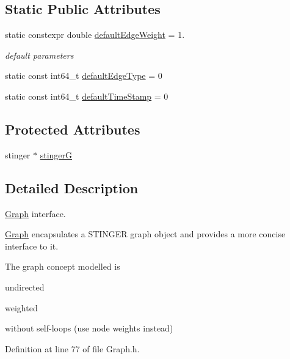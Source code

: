 \subsection*{Static Public Attributes}
\begin{DoxyCompactItemize}
\item 
static constexpr double \hyperlink{class_ensemble_clustering_1_1_graph_a8186ee969064a4e12b779b1dc506ac60}{default\-Edge\-Weight} = 1.
\begin{DoxyCompactList}\small\item\em default parameters \end{DoxyCompactList}\item 
static const int64\-\_\-t \hyperlink{class_ensemble_clustering_1_1_graph_a377621f37c1dc58f32ecec0fd229408e}{default\-Edge\-Type} = 0
\item 
static const int64\-\_\-t \hyperlink{class_ensemble_clustering_1_1_graph_a9a6623d55f673a3b30e0c23284dd6da1}{default\-Time\-Stamp} = 0
\end{DoxyCompactItemize}
\subsection*{Protected Attributes}
\begin{DoxyCompactItemize}
\item 
stinger $\ast$ \hyperlink{class_ensemble_clustering_1_1_graph_af83709e85afb91c70729405a725afb9a}{stinger\-G}
\end{DoxyCompactItemize}


\subsection{Detailed Description}
\hyperlink{class_ensemble_clustering_1_1_graph}{Graph} interface. 

\hyperlink{class_ensemble_clustering_1_1_graph}{Graph} encapsulates a S\-T\-I\-N\-G\-E\-R graph object and provides a more concise interface to it.

The graph concept modelled is
\begin{DoxyItemize}
\item undirected
\item weighted
\item without self-\/loops (use node weights instead) 
\end{DoxyItemize}

Definition at line 77 of file Graph.\-h.



